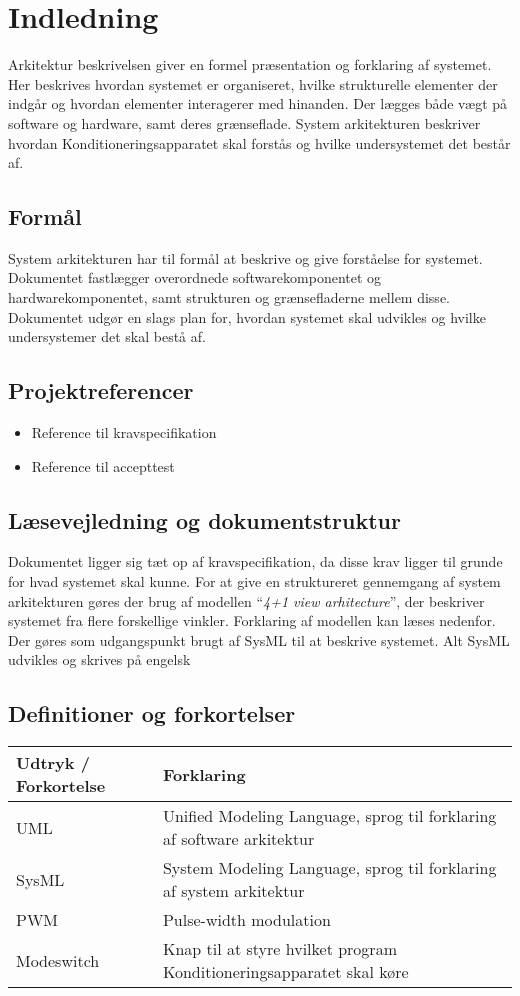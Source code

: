 	\chapter{Indledning}
	Arkitektur beskrivelsen giver en formel præsentation og forklaring af systemet. Her beskrives hvordan systemet er organiseret, hvilke strukturelle elementer der indgår og hvordan elementer interagerer med hinanden. Der lægges både vægt på software og hardware, samt deres grænseflade. System arkitekturen beskriver hvordan Konditioneringsapparatet skal forstås og hvilke undersystemet det består af. 
	
	\section{Formål}
	System arkitekturen har til formål at beskrive og give forståelse for systemet. Dokumentet fastlægger overordnede softwarekomponentet og hardwarekomponentet, samt strukturen og grænsefladerne mellem disse. Dokumentet udgør en slags plan for, hvordan systemet skal udvikles og hvilke undersystemer det skal bestå af. 
	
	\section{Projektreferencer}
	\begin{itemize}
		\item Reference til kravspecifikation
		\item Reference til accepttest
	\end{itemize}
	
	\section{Læsevejledning og dokumentstruktur}
	Dokumentet ligger sig tæt op af kravspecifikation, da disse krav ligger til grunde for hvad systemet skal kunne. For at give en struktureret gennemgang af system arkitekturen gøres der brug af modellen “\textit{4+1 view arhitecture}”, der beskriver systemet fra flere forskellige vinkler. Forklaring af modellen kan læses nedenfor. Der gøres som udgangspunkt brugt af SysML til at beskrive systemet. Alt SysML udvikles og skrives på engelsk

	\section{Definitioner og forkortelser}
	\begin{longtable}{ |p{} |p{}| } 
		\hline
		\textbf{Udtryk / Forkortelse} &  \textbf{Forklaring} \\
		\hline
		UML & Unified Modeling Language, sprog til forklaring af software arkitektur \\
		\hline
		SysML & System Modeling Language, sprog til forklaring af system arkitektur \\
		\hline
		PWM & Pulse-width modulation \\
		\hline
		Modeswitch & Knap til at styre hvilket program Konditioneringsapparatet skal køre \\
		\hline
	\end{longtable}